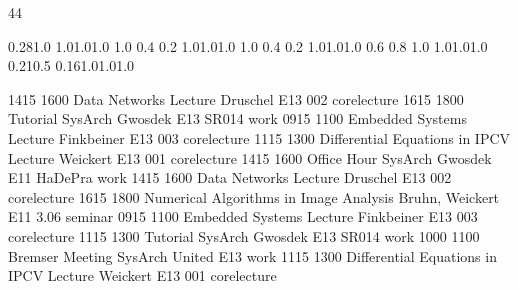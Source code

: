 \documentclass[a4paper,10pt]{report}
\begin{document}
\thispagestyle{empty}
\noindent{}

\setslotsize{4cm}{0.3cm}
 {44}
\settextframe{0.8mm}



 {0.28}{1.0} {1.0}{1.0}{1.0}
    {1.0} {0.4} {0.2} {1.0}{1.0}{1.0}
 {1.0} {0.4} {0.2} {1.0}{1.0}{1.0}
   {0.6} {0.8} {1.0} {1.0}{1.0}{1.0}
       {0.21}{0.5} {0.16}{1.0}{1.0}{1.0}

\begin{timetable}
  \drawgrid
   {1415} {1600} {Data Networks Lecture}                  {Druschel}        {E1{\tiny 3} 002}     {corelecture}
   {1615} {1800} {Tutorial SysArch}                       {Gwosdek}         {E1{\tiny 3} SR014}   {work}
   {0915} {1100} {Embedded Systems Lecture}               {Finkbeiner}      {E1{\tiny 3} 003}     {corelecture}
   {1115} {1300} {Differential Equations in IPCV Lecture} {Weickert}        {E1{\tiny 3} 001}     {corelecture}
   {1415} {1600} {Office Hour SysArch}                    {Gwosdek}         {E1{\tiny 1} HaDePra} {work}
   {1415} {1600} {Data Networks Lecture}                  {Druschel}        {E1{\tiny 3} 002}     {corelecture}
   {1615} {1800} {Numerical Algorithms in Image Analysis} {Bruhn, Weickert} {E1{\tiny 1} 3.06}    {seminar}
   {0915} {1100} {Embedded Systems Lecture}               {Finkbeiner}      {E1{\tiny 3} 003}     {corelecture}
   {1115} {1300} {Tutorial SysArch}                       {Gwosdek}         {E1{\tiny 3} SR014}   {work}
   {1000} {1100} {Bremser Meeting}                        {SysArch United}  {E1{\tiny 3}}         {work}
   {1115} {1300} {Differential Equations in IPCV Lecture} {Weickert}        {E1{\tiny 3} 001}     {corelecture}
\end{timetable}
\end{document}
